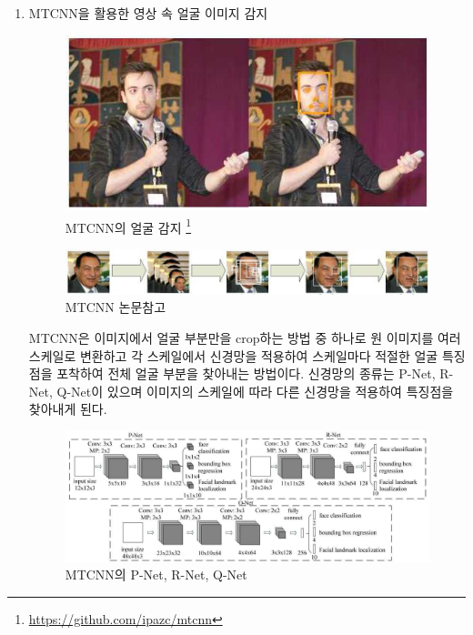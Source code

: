\documentclass[chapter,oneside]{oblivoir}
\begin{document}
\begin{enumerate}
    
    \item MTCNN을 활용한 영상 속 얼굴 이미지 감지


    \begin{figure}[h!]
      \centering
        \includegraphics{pic/chp5/img881}
      \caption{MTCNN의 얼굴 감지 \protect\footnote{\protect\url {https://github.com/ipazc/mtcnn}}}
    \end{figure}

    \begin{figure}[h!]
      \centering
        \includegraphics[scale = 0.7]{pic/chp5/img882}
      \caption{MTCNN 논문참고}
    \end{figure}



    MTCNN은 이미지에서 얼굴 부분만을 crop하는 방법 중 하나로 원 이미지를 여러 스케일로 변환하고 각 스케일에서 신경망을 적용하여 스케일마다 적절한 얼굴 특징점을 포착하여 전체 얼굴 부분을 찾아내는 방법이다. 신경망의 종류는 P-Net, R-Net, Q-Net이 있으며 이미지의 스케일에 따라 다른 신경망을 적용하여 특징점을 찾아내게 된다.

    \begin{figure}[h!]
      \centering
        \includegraphics{pic/chp5/img885}
      \caption{MTCNN의 P-Net, R-Net, Q-Net}
    \end{figure}



\end{enumerate}
\end{document}
